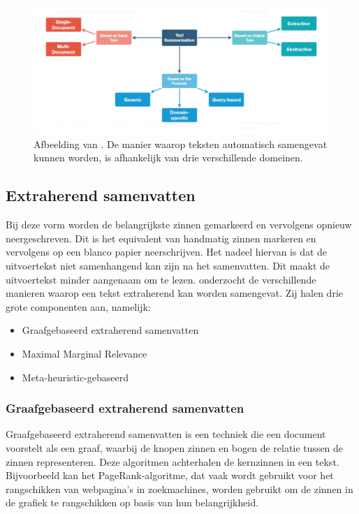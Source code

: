 \begin{figure}
	\includegraphics{img/summarization-mindmap.png}
	\caption{Afbeelding van \textcite{Chauchan2018}. De manier waarop teksten automatisch samengevat kunnen worden, is afhankelijk van drie verschillende domeinen.}
\end{figure}

\subsection{Extraherend samenvatten}

Bij deze vorm worden de belangrijkste zinnen gemarkeerd en vervolgens opnieuw neergeschreven.  Dit is het equivalent van handmatig zinnen markeren en vervolgens op een blanco papier neerschrijven. Het nadeel hiervan is dat de uitvoertekst niet samenhangend kan zijn na het samenvatten. Dit maakt de uitvoertekst minder aangenaam om te lezen. \textcite{Verma2020} onderzocht de verschillende manieren waarop een tekst extraherend kan worden samengevat. Zij halen drie grote componenten aan, namelijk:

\begin{itemize}
	\item Graafgebaseerd extraherend samenvatten
	\item Maximal Marginal Relevance
	\item Meta-heuristic-gebaseerd
\end{itemize}

\subsubsection{Graafgebaseerd extraherend samenvatten}

Graafgebaseerd extraherend samenvatten is een techniek die een document voorstelt als een graaf, waarbij de knopen zinnen en bogen de relatie tussen de zinnen representeren. Deze algoritmen achterhalen de kernzinnen in een tekst. Bijvoorbeeld kan het PageRank-algoritme, dat vaak wordt gebruikt voor het rangschikken van webpagina's in zoekmachines, worden gebruikt om de zinnen in de grafiek te rangschikken op basis van hun belangrijkheid.


